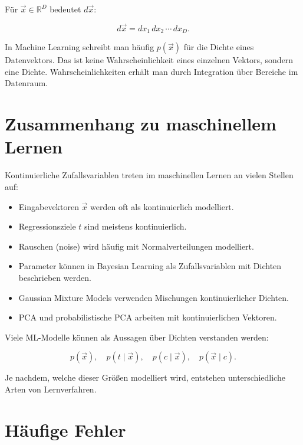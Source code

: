 Für \(\vec{x} \in \mathbb{R}^D\) bedeutet \(d\vec{x}\):

\[
    d\vec{x}
    =
    dx_1\,dx_2\,\cdots\,dx_D.
\]

\begin{notebox}
In Machine Learning schreibt man häufig \(p(\vec{x})\) für die Dichte eines Datenvektors.
Das ist keine Wahrscheinlichkeit eines einzelnen Vektors, sondern eine Dichte.
Wahrscheinlichkeiten erhält man durch Integration über Bereiche im Datenraum.
\end{notebox}

\section{Zusammenhang zu maschinellem Lernen}

Kontinuierliche Zufallsvariablen treten im maschinellen Lernen an vielen Stellen auf:

\begin{itemize}
    \item Eingabevektoren \(\vec{x}\) werden oft als kontinuierlich modelliert.
    \item Regressionsziele \(t\) sind meistens kontinuierlich.
    \item Rauschen (noise) wird häufig mit Normalverteilungen modelliert.
    \item Parameter können in Bayesian Learning als Zufallsvariablen mit Dichten beschrieben werden.
    \item Gaussian Mixture Models verwenden Mischungen kontinuierlicher Dichten.
    \item PCA und probabilistische PCA arbeiten mit kontinuierlichen Vektoren.
\end{itemize}

\begin{conceptbox}
Viele ML-Modelle können als Aussagen über Dichten verstanden werden:

\[
    p(\vec{x}),
    \quad
    p(t \mid \vec{x}),
    \quad
    p(c \mid \vec{x}),
    \quad
    p(\vec{x} \mid c).
\]

Je nachdem, welche dieser Größen modelliert wird, entstehen unterschiedliche Arten von Lernverfahren.
\end{conceptbox}

\section{Häufige Fehler}

